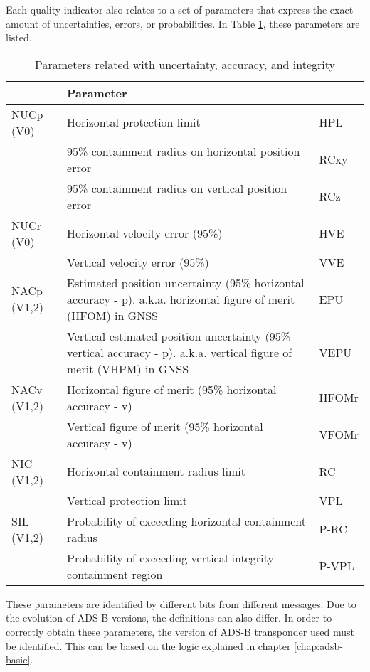 Each quality indicator also relates to a set of parameters that express the exact amount of uncertainties, errors, or probabilities. In Table \ref{tb:uncertainty-parameters}, these parameters are listed.


\begin{table}[ht]
\caption{Parameters related with uncertainty, accuracy, and integrity}
\label{tb:uncertainty-parameters}
\begin{tabular}{|l|p{8cm}|l|}
\hline
\textbf{} & \textbf{Parameter} &  \\ \hline
NUCp (V0) & Horizontal protection limit & HPL \\ \cline{2-3}
 & 95\% containment radius on horizontal position error & RCxy \\ \cline{2-3}
 & 95\% containment radius on vertical position error & RCz \\ \hline
NUCr (V0) & Horizontal velocity error (95\%) & HVE \\ \cline{2-3}
 & Vertical velocity error (95\%) & VVE \\ \hline
NACp (V1,2) & Estimated position uncertainty (95\% horizontal accuracy - p). a.k.a. horizontal figure of merit (HFOM) in GNSS & EPU \\ \cline{2-3}
 & Vertical estimated position uncertainty (95\% vertical accuracy - p). a.k.a. vertical figure of merit (VHPM) in GNSS & VEPU \\ \hline
NACv (V1,2) & Horizontal figure of merit (95\% horizontal accuracy - v) & HFOMr \\ \cline{2-3}
 & Vertical figure of merit (95\% horizontal accuracy - v) & VFOMr \\ \hline
NIC (V1,2) & Horizontal containment radius limit & RC \\ \cline{2-3}
 & Vertical protection limit & VPL \\ \hline
SIL (V1,2) & Probability of exceeding horizontal containment radius & P-RC \\ \cline{2-3}
 & Probability of exceeding vertical integrity containment region & P-VPL \\ \hline
\end{tabular}
\end{table}

These parameters are identified by different bits from different messages. Due to the evolution of ADS-B versions, the definitions can also differ. In order to correctly obtain these parameters, the version of ADS-B transponder used must be identified. This can be based on the logic explained in chapter \ref{chap:adsb-basic}.

